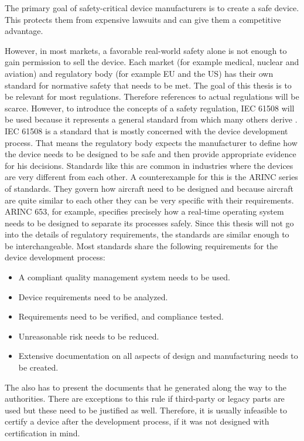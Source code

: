 The primary goal of safety-critical device manufacturers is to create a safe device. This protects them from expensive lawsuits and can give them a competitive advantage.

However, in most markets, a favorable real-world safety alone is not enough to gain permission to sell the device.  Each market (for example medical, nuclear and aviation) and regulatory body (for example EU and the US) has their own standard for normative safety that needs to be met. The goal of this thesis is to be relevant for most regulations. Therefore references to actual regulations will be scarce. However, to introduce the concepts of a safety regulation, IEC 61508 will be used because it represents a general standard from which many others derive \cite{IEC.2000-1}\cite{IEC.2000-2}\cite{IEC.2000-3}. IEC 61508 is a standard that is mostly concerned with the device development process. That means the regulatory body expects the manufacturer to define how the device needs to be designed to be safe and then provide appropriate evidence for his decisions. Standards like this are common in industries where the devices are very different from each other. A counterexample for this is the ARINC series of standards. They govern how aircraft need to be designed and because aircraft are quite similar to each other they can be very specific with their requirements. ARINC 653, for example, specifies precisely how a real-time operating system needs to be designed to separate its processes safely. Since this thesis will not go into the details of regulatory requirements, the standards are similar enough to be interchangeable. Most standards share the following requirements for the device development process:
\begin{itemize}
\item A compliant quality management system needs to be used.
\item Device requirements need to be analyzed.
\item Requirements need to be verified, and compliance tested.
\item Unreasonable risk needs to be reduced.
\item Extensive documentation on all aspects of design and manufacturing needs to be created.
\end{itemize}

The \mfg{} also has to present the documents that he generated along the way to the authorities. There are exceptions to this rule if third-party or legacy parts are used but these need to be justified as well. Therefore, it is usually infeasible to certify a device after the development process, if it was not designed with certification in mind. 

